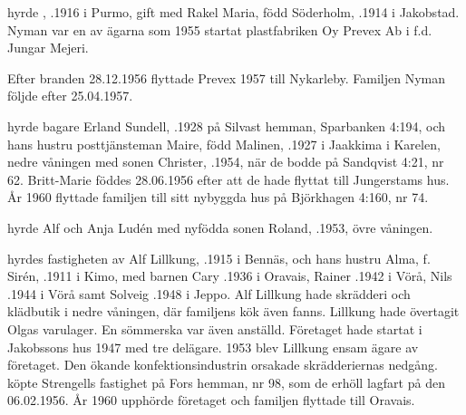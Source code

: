  hyrde , .1916 i Purmo, gift med Rakel Maria, född Söderholm, .1914 i Jakobstad. Nyman var en av ägarna som 1955 startat plastfabriken Oy Prevex Ab i f.d. Jungar Mejeri.
\begin{jhchildren}
  \item {}
  \item {}
  \item {}
  \item {}
\end{jhchildren}
Efter branden 28.12.1956 flyttade Prevex 1957 till Nykarleby. Familjen Nyman följde efter 25.04.1957.

 hyrde bagare Erland Sundell, .1928 på Silvast hemman, Sparbanken 4:194, och hans hustru posttjänsteman Maire, född Malinen, .1927 i Jaakkima i Karelen, nedre våningen med sonen Christer, .1954, när de bodde på Sandqvist 4:21, nr 62.  Britt-Marie föddes 28.06.1956 efter att de hade flyttat till Jungerstams hus. År 1960 flyttade familjen till sitt nybyggda hus på Björkhagen 4:160, nr 74.

 hyrde Alf och Anja Ludén med nyfödda sonen Roland, .1953, övre våningen.

 hyrdes fastigheten av Alf Lillkung, .1915  i Bennäs, och hans hustru Alma, f. Sirén, .1911 i Kimo, med barnen Cary .1936 i Oravais, Rainer .1942 i Vörå, Nils .1944 i Vörå samt Solveig .1948 i Jeppo. Alf Lillkung hade skrädderi och klädbutik i nedre våningen, där familjens kök även fanns.  Lillkung hade övertagit Olgas varulager. En sömmerska var även anställd. Företaget hade startat i Jakobssons hus 1947 med tre delägare. 1953 blev Lillkung ensam ägare av företaget. Den ökande konfektionsindustrin orsakade skrädderiernas nedgång.  köpte Strengells fastighet på Fors hemman, nr 98, som de erhöll lagfart på den 06.02.1956. År 1960 upphörde företaget och familjen flyttade till Oravais.

